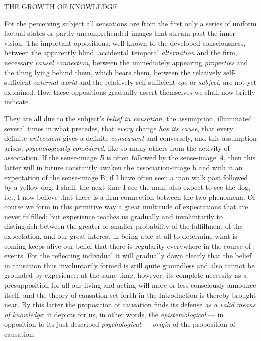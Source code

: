 \documentclass[12pt,a4paper,openany]{book}
\newcommand{\opage}[1]{\marginnote{\footnotesize\textit{[#1]}}}
\newcommand{\excerpthead}[1]{\par\bigskip\begin{center}#1\end{center}\nopagebreak\smallskip}
\begin{document}
\excerpthead{THE GROWTH OF KNOWLEDGE}


For the perceiving subject all sensations are from the first only a series of uniform
factual states or partly uncomprehended images that stream past the inner vision. The
important oppositions, well known to the developed consciousness, between the apparently
blind, accidental temporal \emph{alternation} and the firm, necessary \emph{causal}
\setcounter{footnote}{0}%
\opage{248}\emph{connection}, between the immediately appearing \emph{properties} and the thing
lying behind them, which bears them, between the relatively self-sufficient \emph{external
world} and the relatively self-sufficient \emph{ego} or \emph{subject}, are not yet
explained. How these oppositions gradually assert themselves we shall now briefly
indicate.

They are all due to the subject's \emph{belief in causation}, the assumption, illuminated
several times in what precedes, that \emph{every} change \emph{has its cause}, that every
definite \emph{antecedent} gives a definite \emph{consequent} and conversely, and this
assumption arises, \emph{psychologically considered}, like so many others from the
activity of association. If the sense-image \textit{B} is often followed by the
sense-image \textit{A}, then this latter will in future constantly awaken the
association-image b and with it an expectation of the sense-image B; if I have often
seen a man walk past followed by a yellow dog, I shall, the next time I see the man, also
expect to see the dog, i.e., I now believe that there is a firm connection between the
two phenomena. Of course we form in this primitive way a great multitude of expectations
that are never fulfilled; but experience teaches us gradually and involuntarily to
distinguish between the greater or smaller probability of the fulfillment of the
expectation, and our great interest in being able at all to determine what is coming
keeps alive our belief that there is regularity everywhere in the course of events. For
the reflecting individual it will gradually dawn clearly that the belief in causation
thus involuntarily formed is still quite groundless and also cannot be grounded by
experience; at the same time, however, its complete necessity as a presupposition for all
our living and acting will more or less consciously announce itself, and the theory of
causation set forth in the Introduction is thereby brought near. By this latter the
proposition of causation finds its defense \emph{as a valid}
\emph{means of knowledge}; it depicts for us, in other words, the \emph{epistemological}
--- in opposition to its just-described \emph{psychological} --- \emph{origin} of the
proposition of causation.
\end{document}
